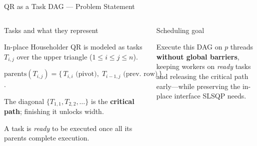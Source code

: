 \begin{frame}{QR as a Task DAG — Problem Statement}
\small
\begin{columns}[T,onlytextwidth]

  \begin{block}{Tasks and what they represent}
    \begin{tightitem}
      \item In-place Householder QR is modeled as tasks $T_{i,j}$ over the upper triangle ($1\!\le\!i\!\le\!j\!\le\!n$).

      \item $\mathrm{parents}(T_{i,j})=\{\,T_{i,i}\text{ (pivot)},\;T_{i-1,j}\text{ (prev.\ row)}\,\}$ .
      \item The diagonal $\{T_{1,1},T_{2,2},\ldots\}$ is the \textbf{critical path}; finishing it unlocks width.
      \item A task is \emph{ready} to be executed once all its parents complete execution.
    \end{tightitem}
  \end{block}

  \vspace{0.5mm}
  \begin{block}{Scheduling goal}
    \begin{tightitem}
      \item Execute this DAG on $p$ threads \textbf{without global barriers}, keeping workers on \emph{ready} tasks and releasing the critical path early—while preserving the in-place interface SLSQP needs.
    \end{tightitem}
  \end{block}

    \centering
\end{columns}
\end{frame}
